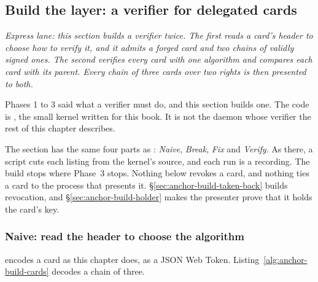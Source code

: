%
\subsection{Build the layer: a verifier for delegated cards}
\label{sec:anchor-build}

\noindent\emph{Express lane: this section builds a verifier twice. The first
reads a card's header to choose how to verify it, and it admits a forged card
and two chains of validly signed ones. The second verifies every card with
one algorithm and compares each card with its parent. Every chain of three
cards over two rights is then presented to both.}

Phases 1 to 3 said what a verifier must do, and this section builds one. The
code is \pdkernelname{}, the small kernel written for this book. It is not
the daemon whose verifier the rest of this chapter describes.

The section has the same four parts as :
\emph{Naive}, \emph{Break}, \emph{Fix} and \emph{Verify}. As there, a
script cuts each listing from the kernel's source, and each run is a
recording. The build stops where Phase~3 stops. Nothing below revokes a
card, and nothing ties a card to the process that presents it.
\S\ref{sec:anchor-build-taken-back} builds revocation, and
\S\ref{sec:anchor-build-holder} makes the presenter prove that it holds the
card's key.

\subsubsection{Naive: read the header to choose the algorithm}

\pdkernelname{} encodes a card as this chapter does, as a JSON Web Token.
Listing~\ref{alg:anchor-build-cards} decodes a chain of three.


